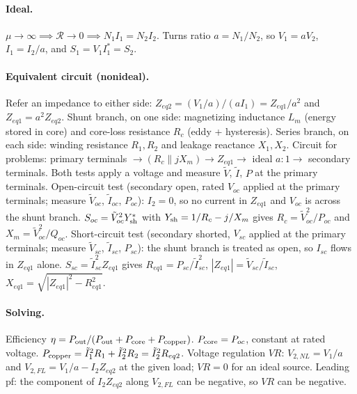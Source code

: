 \documentclass{article}
\begin{document}
\paragraph{Ideal.}
$\mu\to\infty \implies \mathcal R\to 0 \implies N_1 I_1 = N_2 I_2$.
Turns ratio $a = N_1/N_2$, so $V_1 = aV_2$, $I_1 = I_2/a$, and $S_1 = V_1 I_1^* = S_2$.

\paragraph{Equivalent circuit (nonideal).}
Refer an impedance to either side: $Z_{eq2} = (V_1/a)/(aI_1) = Z_{eq1}/a^2$ and $Z_{eq1} = a^2 Z_{eq2}$.
Shunt branch, on one side: magnetizing inductance $L_m$ (energy stored in core) and core-loss resistance $R_c$ (eddy + hysteresis).
Series branch, on each side: winding resistance $R_1, R_2$ and leakage reactance $X_1, X_2$.
Circuit for problems: primary terminals $\to (R_c \parallel jX_m) \to Z_{eq1} \to$ ideal $a{:}1 \to$ secondary terminals.
Both tests apply a voltage and measure $\tilde V$, $\tilde I$, $P$ at the primary terminals.
Open-circuit test (secondary open, rated $V_{oc}$ applied at the primary terminals; measure $\tilde V_{oc}$, $\tilde I_{oc}$, $P_{oc}$): $I_2 = 0$, so no current in $Z_{eq1}$ and $V_{oc}$ is across the shunt branch.
$S_{oc} = \tilde V_{oc}^2 Y_{\rm sh}^*$ with $Y_{\rm sh} = 1/R_c - j/X_m$ gives $R_c = \tilde V_{oc}^2/P_{oc}$ and $X_m = \tilde V_{oc}^2/Q_{oc}$.
Short-circuit test (secondary shorted, $V_{sc}$ applied at the primary terminals; measure $\tilde V_{sc}$, $\tilde I_{sc}$, $P_{sc}$): the shunt branch is treated as open, so $I_{sc}$ flows in $Z_{eq1}$ alone.
$S_{sc} = \tilde I_{sc}^2 Z_{eq1}$ gives $R_{eq1} = P_{sc}/\tilde I_{sc}^2$, $|Z_{eq1}| = \tilde V_{sc}/\tilde I_{sc}$, $X_{eq1} = \sqrt{|Z_{eq1}|^2 - R_{eq1}^2}$.

\paragraph{Solving.}
Efficiency $\eta = P_{\rm out}/(P_{\rm out} + P_{\rm core} + P_{\rm copper})$.
$P_{\rm core} = P_{oc}$, constant at rated voltage.
$P_{\rm copper} = \tilde I_1^2 R_1 + \tilde I_2^2 R_2 = \tilde I_2^2 R_{eq2}$.
Voltage regulation $VR$: $V_{2,NL} = V_1/a$ and $V_{2,FL} = V_1/a - I_2 Z_{eq2}$ at the given load; $VR = 0$ for an ideal source.
Leading pf: the component of $I_2 Z_{eq2}$ along $V_{2,FL}$ can be negative, so $VR$ can be negative.
\end{document}
